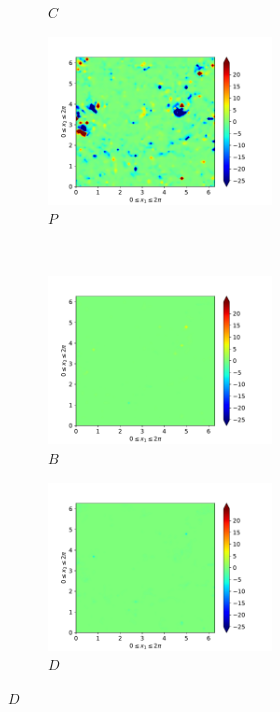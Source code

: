 \begin{figure}[H]
\begin{subfigure}{0.45\textwidth}
        \caption{$C$}
    \end{subfigure}
    \newline
    \begin{subfigure}{0.45\textwidth}
        \includegraphics[height=1.75in]{media/run-cds-65/P-ke-1460}
        \caption{$P$}
    \end{subfigure}
    ~
    \begin{subfigure}{0.45\textwidth}
        \includegraphics[height=1.75in]{media/run-cds-65/B-ke-1460}
        \caption{$B$}
    \end{subfigure}
    \newline
    \begin{subfigure}{0.45\textwidth}
        \includegraphics[height=1.75in]{media/run-cds-65/D-ke-1460}
        \caption{$D$}
    \end{subfigure}
\end{figure}
